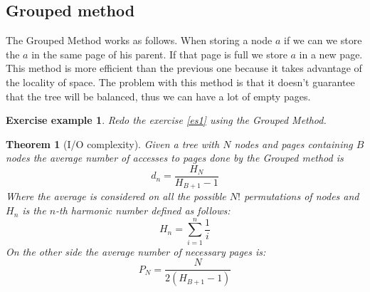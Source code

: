 \documentclass{report}
\newtheorem{teo}{Theorem}[chapter]
\newtheorem{es}{Exercise example}[chapter]
\begin{document}
\subsection{Grouped method}
The Grouped Method works as follows. When storing a node \(a\) if we can we store the \(a\) in the same page of his parent. If that page is full we store \(a\) in a new page. This method is more efficient than the previous one because it takes advantage of the locality of space. The problem with this method is that it doesn't guarantee that the tree will be balanced, thus we can have a lot of empty pages.
\begin{es}
    Redo the exercise \ref{es1} using the Grouped Method.
\end{es}
\begin{teo}[I/O complexity]
    Given a tree with \(N\) nodes and pages containing \(B\) nodes the average number of accesses to pages done by the Grouped method is
    \begin{equation}
        d_n = \frac{H_N}{H_{B+1}-1}
    \end{equation}
    Where the average is considered on all the possible \(N!\) permutations of nodes and \(H_n\) is the \(n\)-th harmonic number defined as follows:
    \begin{equation}
        H_n = \sum_{i=1}^{n} \frac{1}{i}
    \end{equation}
    On the other side the average number of necessary pages is:
    \begin{equation}
        P_N = \frac{N}{2(H_{B+1}-1)}
    \end{equation}
\end{teo}
\end{document}
